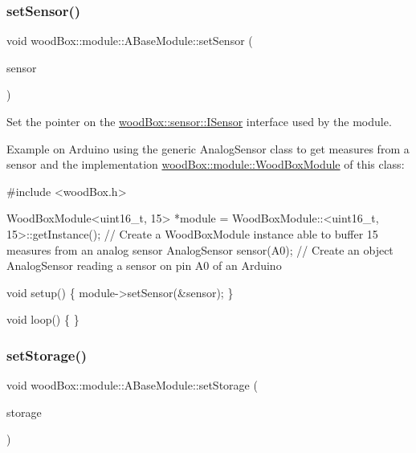 \subsubsection{\texorpdfstring{set\+Sensor()}{setSensor()}}
{\footnotesize\ttfamily void wood\+Box\+::module\+::\+A\+Base\+Module\+::set\+Sensor (\begin{DoxyParamCaption}\item[{\mbox{\hyperlink{classwood_box_1_1sensor_1_1_i_sensor}{sensor\+::\+I\+Sensor}} $\ast$}]{sensor }\end{DoxyParamCaption})}

Set the pointer on the \mbox{\hyperlink{classwood_box_1_1sensor_1_1_i_sensor}{wood\+Box\+::sensor\+::\+I\+Sensor}} interface used by the module.

Example on Arduino using the generic Analog\+Sensor class to get measures from a sensor and the implementation \mbox{\hyperlink{classwood_box_1_1module_1_1_wood_box_module}{wood\+Box\+::module\+::\+Wood\+Box\+Module}} of this class\+:


\begin{DoxyCode}
\textcolor{preprocessor}{#include <woodBox.h>}

WoodBoxModule<uint16\_t, 15> *module = WoodBoxModule::<uint16\_t, 15>::getInstance(); \textcolor{comment}{// Create a
       WoodBoxModule instance able to buffer 15 measures from an analog sensor}
AnalogSensor sensor(A0); \textcolor{comment}{// Create an object AnalogSensor reading a sensor on pin A0 of an Arduino}

\textcolor{keywordtype}{void} setup() \{
  module->setSensor(&sensor);
\}

\textcolor{keywordtype}{void} loop() \{
\}
\end{DoxyCode}
 \mbox{\label{classwood_box_1_1module_1_1_a_base_module_af9e009af37d04062c2da7d977baded80}} 
\subsubsection{\texorpdfstring{set\+Storage()}{setStorage()}}
{\footnotesize\ttfamily void wood\+Box\+::module\+::\+A\+Base\+Module\+::set\+Storage (\begin{DoxyParamCaption}\item[{\mbox{\hyperlink{classwood_box_1_1storage_1_1_i_storage}{storage\+::\+I\+Storage}} $\ast$}]{storage }\end{DoxyParamCaption})}


